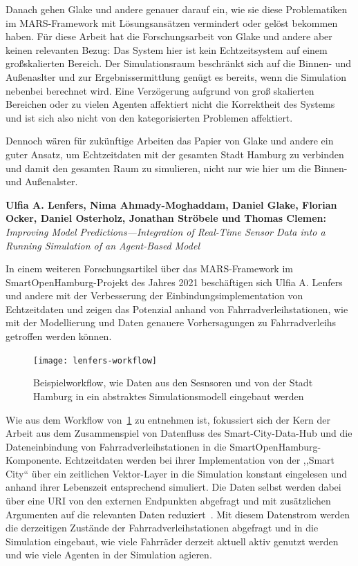 Danach gehen Glake und andere genauer darauf ein, wie sie diese Problematiken im MARS-Framework mit Lösungsansätzen vermindert oder gelöst bekommen haben.
Für diese Arbeit hat die Forschungsarbeit von Glake und andere aber keinen relevanten Bezug:
Das System hier ist kein Echtzeitsystem auf einem großskalierten Bereich.
Der Simulationsraum beschränkt sich auf die Binnen- und Außenaslter und zur Ergebnissermittlung genügt es bereits, wenn die Simulation nebenbei berechnet wird.
Eine Verzögerung aufgrund von groß skalierten Bereichen oder zu vielen Agenten affektiert nicht die Korrektheit des Systems und ist sich also nicht von den kategorisierten Problemen affektiert.

Dennoch wären für zukünftige Arbeiten das Papier von Glake und andere ein guter Ansatz, um Echtzeitdaten mit der gesamten Stadt Hamburg zu verbinden und damit den gesamten Raum zu simulieren, nicht nur wie hier um die Binnen- und Außenalster.


\textbf{Ulfia A. Lenfers, Nima Ahmady-Moghaddam, Daniel Glake, Florian Ocker, Daniel Osterholz, Jonathan Ströbele und Thomas Clemen:}
\textit{Improving Model Predictions—Integration of Real-Time Sensor Data into a Running Simulation of an Agent-Based Model}

In einem weiteren Forschungsartikel über das MARS-Framework im SmartOpenHamburg-Projekt des Jahres 2021 beschäftigen sich Ulfia A. Lenfers und andere mit der Verbesserung der Einbindungsimplementation von Echtzeitdaten und zeigen das Potenzial anhand von Fahrradverleihstationen, wie mit der Modellierung und Daten genauere Vorhersagungen zu Fahrradverleihs getroffen werden können.

\begin{figure}[h]
    \centering
    \texttt{[image: lenfers-workflow]}~\caption{Beispielworkflow, wie Daten aus den Sesnsoren und von der Stadt Hamburg in ein abstraktes Simulationsmodell eingebaut werden~\cite{Lenfers-MP-2021}}
    \label{fig:lenfers-workflow-sensors}
\end{figure}

Wie aus dem Workflow von~\ref{fig:lenfers-workflow-sensors} zu entnehmen ist, fokussiert sich der Kern der Arbeit aus dem Zusammenspiel von Datenfluss des Smart-City-Data-Hub und die Dateneinbindung von Fahrradverleihstationen in die SmartOpenHamburg-Komponente.
Echtzeitdaten werden bei ihrer Implementation von der ,,Smart City`` über ein zeitlichen Vektor-Layer in die Simulation konstant eingelesen und anhand ihrer Lebenszeit entsprechend simuliert\cite{Lenfers-MP-2021}.
Die Daten selbst werden dabei über eine URI von den externen Endpunkten abgefragt und mit zusätzlichen Argumenten auf die relevanten Daten reduziert~.
Mit diesem Datenstrom werden die derzeitigen Zustände der Fahrradverleihstationen abgefragt und in die Simulation eingebaut, wie viele Fahrräder derzeit aktuell aktiv genutzt werden und wie viele Agenten in der Simulation agieren\cite{Lenfers-MP-2021}.

